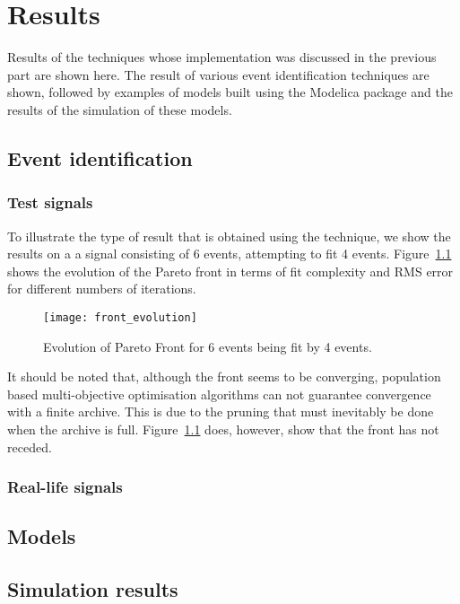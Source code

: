 \chapter{Results}\label{chap:results}
\begin{overview}
  Results of the techniques whose implementation was discussed in the
  previous part are shown here.  The result of various event
  identification techniques are shown, followed by examples of models
  built using the Modelica package and the results of the simulation of these models.
\end{overview}

\section{Event identification}
\subsection{Test signals}
To illustrate the type of result that is obtained using the technique,
we show the results on a a signal consisting of 6 events, attempting
to fit 4 events.  Figure~\ref{fig:front_evolution} shows the evolution
of the Pareto front in terms of fit complexity and RMS error for
different numbers of iterations.

\begin{figure}[htbp]
  \centering
  \texttt{[image: front\_evolution]}
  \caption{Evolution of Pareto Front for 6 events being fit by 4 events.}
  \label{fig:front_evolution}
\end{figure}

It should be noted that, although the front seems to be converging,
population based multi-objective optimisation algorithms can not
guarantee convergence with a finite archive.  This is due to the
pruning that must inevitably be done when the archive is full.
Figure~\ref{fig:front_evolution} does, however, show that the front has not
receded.

\subsection{Real-life signals}


\section{Models}

\section{Simulation results}


